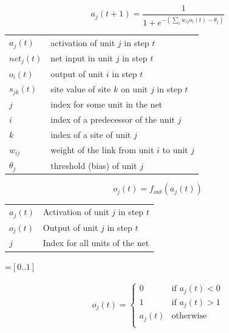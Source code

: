 {\newpage
\clearpage
\samepage \begin{displaymath}%
a_{j}(t+1) = \frac{1}{{1 + e^{- \left( \sum_{i} w_{ij} o_{i}(t) 
                                        - \theta_{j} \right) }}}
\end{displaymath}
}

{\newpage
\clearpage
\samepage \begin{tabular}%
{ll}
         $a_{j}(t)$   & activation of unit $j$ in step $t$\\ 
         $net_{j}(t)$ & net input in unit $j$ in step $t$\\ 
         $o_{i}(t)$   & output of unit $i$ in step $t$\\ 
         $s_{jk}(t)$  & site value of site $k$ on unit $j$ in step $t$\\ 
         $j$          & index for some unit in the net\\ 
         $i$          & index of a predecessor of the unit $j$\\ 
         $k$          & index of a site of unit $j$\\ 
         $w_{ij}$     & weight of the link from unit $i$ to unit $j$\\ 
         $\theta_{j}$ & threshold (bias) of unit $j$\\ 
\end{tabular}
}

{\newpage
\clearpage
\samepage \begin{displaymath}o_{j}(t) = f_{out}(a_{j}(t))
\end{displaymath}
}

{\newpage
\clearpage
\samepage \begin{tabular}{ll}
         $a_{j}(t)$ &    Activation of unit $j$ in step $t$\\ 
         $o_{j}(t)$ &    Output of unit $j$ in step $t$\\ 
         $j$        &    Index for all units of the net\\ 
\end{tabular}
}

{\newpage
\clearpage
\samepage \setbox\sizebox=\hbox{$[0..1]$}\box\sizebox
}

{\newpage
\clearpage
\samepage \begin{eqnarray*}o_{j}(t) = \left\{ 
        \begin{array}{ll}
        0 & \mbox{if $a_{j}(t) < 0$}\\ 
        1 & \mbox{if $a_{j}(t) > 1$}\\ 
        a_{j}(t) & \mbox{otherwise}\\ 
        \end{array}
        \right.
\end{eqnarray*}
}

